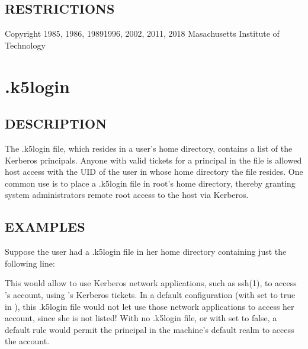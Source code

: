 \documentclass[letterpaper,10pt,english]{sphinxmanual}
\begin{document}
\subsection{RESTRICTIONS}
\label{\detokenize{user/user_config/kerberos:restrictions}}
\sphinxAtStartPar
Copyright 1985, 1986, 1989\sphinxhyphen{}1996, 2002, 2011, 2018 Masachusetts
Institute of Technology

\sphinxstepscope


\section{.k5login}
\label{\detokenize{user/user_config/k5login:k5login}}\label{\detokenize{user/user_config/k5login:k5login-5}}\label{\detokenize{user/user_config/k5login::doc}}

\subsection{DESCRIPTION}
\label{\detokenize{user/user_config/k5login:description}}
\sphinxAtStartPar
The .k5login file, which resides in a user’s home directory, contains
a list of the Kerberos principals.  Anyone with valid tickets for a
principal in the file is allowed host access with the UID of the user
in whose home directory the file resides.  One common use is to place
a .k5login file in root’s home directory, thereby granting system
administrators remote root access to the host via Kerberos.


\subsection{EXAMPLES}
\label{\detokenize{user/user_config/k5login:examples}}
\sphinxAtStartPar
Suppose the user  had a .k5login file in her home directory
containing just the following line:

\begin{sphinxVerbatim}[commandchars=\\\{\}]
\end{sphinxVerbatim}

\sphinxAtStartPar
This would allow  to use Kerberos network applications, such as
ssh(1), to access ’s account, using ’s Kerberos
tickets.  In a default configuration (with  set
to true in ), this .k5login file would not let
 use those network applications to access her account, since
she is not listed!  With no .k5login file, or with 
set to false, a default rule would permit the principal  in the
machine’s default realm to access the  account.
\end{document}
